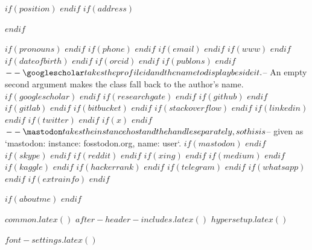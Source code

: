 $if(position)$
$endif$
$if(address)$
\address{$address$}
$endif$

$if(pronouns)$
$endif$
$if(phone)$
$endif$
$if(email)$
$endif$
$if(www)$
$endif$
$if(dateofbirth)$
$endif$
$if(orcid)$
$endif$
$if(publons)$
$endif$
$-- \googlescholar takes the profile id and the name to display beside it.
$-- An empty second argument makes the class fall back to the author's name.
$if(googlescholar)$
$endif$
$if(researchgate)$
$endif$
$if(github)$
$endif$
$if(gitlab)$
$endif$
$if(bitbucket)$
$endif$
$if(stackoverflow)$
$endif$
$if(linkedin)$
$endif$
$if(twitter)$
$endif$
$if(x)$
$endif$
$-- \mastodon takes the instance host and the handle separately, so this is
$-- given as `mastodon: {instance: fosstodon.org, name: user}`.
$if(mastodon)$
$endif$
$if(skype)$
$endif$
$if(reddit)$
$endif$
$if(xing)$
$endif$
$if(medium)$
$endif$
$if(kaggle)$
$endif$
$if(hackerrank)$
$endif$
$if(telegram)$
$endif$
$if(whatsapp)$
$endif$
$if(extrainfo)$
$endif$

$if(aboutme)$
$endif$

$common.latex()$
$after-header-includes.latex()$
$hypersetup.latex()$

$font-settings.latex()$

